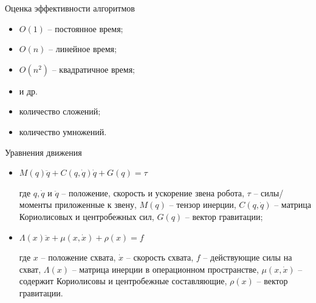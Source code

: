 \documentclass[newPxFont,numfooter,sectionpages]{beamer}
\begin{document}
\begin{frame}{Оценка эффективности алгоритмов}
	\begin{itemize}
		\item $O(1)$ -- постоянное время;
		\item $O(n)$ -- линейное время;
		\item $O(n^2)$ -- квадратичное время;
		\item и др.
	\end{itemize}
	\begin{itemize}
	\item количество сложений;
	\item количество умножений.
	\end{itemize}
\end{frame}

\begin{frame}{Уравнения движения}
\begin{itemize}
	\item {}
	\begin{center}
		$M(q) \ddot q + C(q, \dot q)\dot q + G (q) = \tau$	
	\end{center}
	где $q, \dot q$ и $\ddot q$ -- положение, скорость и ускорение звена робота, $\tau$ -- силы/моменты приложенные к звену, $M(q)$ -- тензор инерции, $C(q, \dot q)$ -- матрица Кориолисовых и центробежных сил, $G(q)$ -- вектор гравитации;
	
	\item {}
	\begin{center}
		$\Lambda(x) \ddot x + \mu (x, \dot x) + \rho (x) = f$
	\end{center}		
	где $x$ -- положение схвата, $\dot x$ -- скорость схвата, $f$ -- действующие силы на схват, $\Lambda(x)$ -- матрица инерции в операционном пространстве, $\mu(x, \dot x)$ -- содержит Кориолисовы и центробежные составляющие, $\rho(x)$ -- вектор гравитации.
\end{itemize}
\end{frame}
\end{document}
